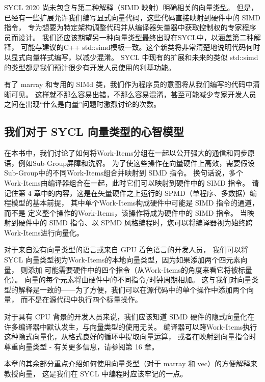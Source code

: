 \begin{remark}
SYCL 2020 尚未包含与第二种解释（SIMD 映射）明确相关的向量类型。
但是，已经有一些扩展允许我们编写显式向量代码，这些代码直接映射到硬件中的 SIMD 指令，
专为想要为特定架构调整代码并从编译器矢量器中获取控制权的专家程序员而设计。
我们还应该期望另一种向量类型最终出现在SYCL中，以涵盖第二种解释，
可能与建议的C++ std::simd模板一致。这个新类将非常清楚地说明代码何时以显式向量样式编写，以减少混淆。
SYCL 中现有的扩展和未来的类似 std::simd 的类型都是我们预计很少有开发人员使用的利基功能。

有了 marray 和专用的 SIMd 类，我们作为程序员的意图将从我们编写的代码中清晰可见。
这样就不那么容易出错，不那么容易混淆，甚至可能减少专家开发人员之间在出现“什么是向量”问题时激烈讨论的次数。
\end{remark}

\subsection{我们对于 SYCL 向量类型的心智模型}
在本书中，我们讨论了如何将Work-Items分组在一起以公开强大的通信和同步原语，例如Sub-Group屏障和洗牌。 
为了使这些操作在向量硬件上高效，需要假设Sub-Group中的不同Work-Items组合并映射到 SIMD 指令。 
换句话说，多个Work-Items由编译器组合在一起，此时它们可以映射到硬件中的 SIMD 指令。 
请记住第 4 章中的内容，这是在矢量硬件之上运行的 SPMD（单程序、多数据）编程模型的基本前提，
其中单个Work-Items构成硬件中可能是 SIMD 指令的通道，而不是 定义整个操作的Work-Items，该操作将成为硬件中的 SIMD 指令。 
当映射到硬件中的 SIMD 指令、以 SPMD 风格编程时，您可以将编译器视为始终跨Work-Items进行向量化。

对于来自没有向量类型的语言或来自 GPU 着色语言的开发人员，
我们可以将 SYCL 向量类型视为Work-Items的本地向量类型，因为如果添加两个四元素向量，
则添加 可能需要硬件中的四个指令（从Work-Items的角度来看它将被标量化）。 
向量的每个元素将由硬件中的不同指令/时钟周期相加。 
这与我们对向量类型的解释是一致的——为了方便，我们可以在源代码中的单个操作中添加两个向量，
而不是在源代码中执行四个标量操作。

对于具有 CPU 背景的开发人员来说，我们应该知道 SIMD 硬件的隐式向量化在许多编译器中默认发生，与向量类型的使用无关。 
编译器可以跨Work-Items执行这种隐式向量化，从格式良好的循环中提取向量运算，
或者在映射到向量指令时尊重向量类型 - 有关更多信息，请参阅第 16 章。

本章的其余部分重点介绍如何使用向量类型（对于 marray 和 vec）的方便解释来教授向量，
这是我们在 SYCL 中编程时应该牢记的一点。

